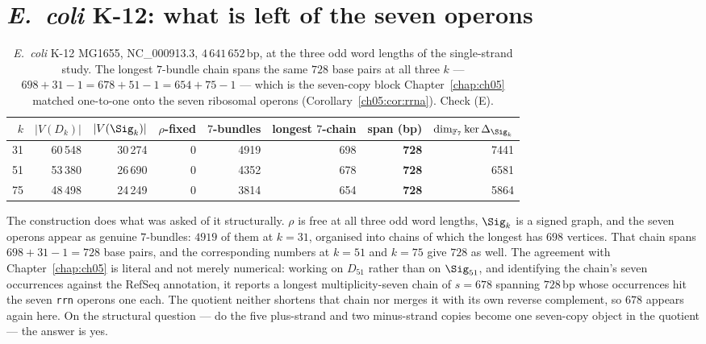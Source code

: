 \section{\emph{E.\ coli} K-12: what is left of the seven operons}

\begin{table}[t]
\centering
\begin{tabular}{rrrrrrrr}
\toprule
$k$ & $|V(D_k)|$ & $|V(\Sig_k)|$ & $\rho$-fixed & $7$-bundles & longest $7$-chain
& span (bp) & $\dim_{\mathbb{F}_7}\ker\Delta_{\Sig_k}$\\
\midrule
31 & 60\,548 & 30\,274 & 0 & 4919 & 698 & \textbf{728} & 7441\\
51 & 53\,380 & 26\,690 & 0 & 4352 & 678 & \textbf{728} & 6581\\
75 & 48\,498 & 24\,249 & 0 & 3814 & 654 & \textbf{728} & 5864\\
\bottomrule
\end{tabular}
\caption{\emph{E.\ coli} K-12 MG1655, NC\_000913.3, $4\,641\,652$\,bp, at the three odd word
lengths of the single-strand study. The longest $7$-bundle chain spans the same $728$
base pairs at all three $k$ --- $698+31-1=678+51-1=654+75-1$ --- which is the seven-copy
block Chapter~\ref{chap:ch05} matched one-to-one onto the seven ribosomal operons
(Corollary~\ref{ch05:cor:rrna}). Check (E).}
\label{ch06:tab:ecoli}
\end{table}

The construction does what was asked of it structurally. $\rho$ is free at all three odd word
lengths, $\Sig_k$ is a signed graph, and the seven operons appear as genuine $7$-bundles:
$4919$ of them at $k=31$, organised into chains of which the longest has $698$ vertices. That
chain spans $698+31-1=728$ base pairs, and the corresponding numbers at $k=51$ and $k=75$
give $728$ as well. The agreement with Chapter~\ref{chap:ch05} is literal and not merely
numerical: working on $D_{51}$ rather than on $\Sig_{51}$, and identifying the chain's seven
occurrences against the RefSeq annotation, it reports a longest multiplicity-seven chain of
$s=678$ spanning $728$\,bp whose occurrences hit the seven \texttt{rrn} operons one each.
The quotient neither shortens that chain nor merges it with its own reverse complement, so
$678$ appears again here. On the structural question --- do the five plus-strand and two
minus-strand copies become one seven-copy object in the quotient --- the answer is yes.

